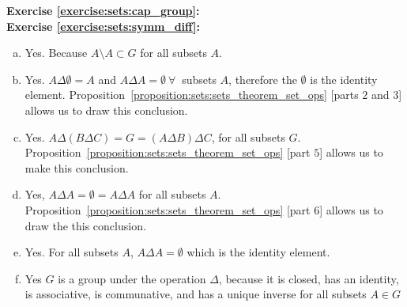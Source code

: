 \noindent\textbf{Exercise \ref{exercise:sets:cap_group}:}\\

\noindent\textbf{Exercise \ref{exercise:sets:symm_diff}:} %
\begin{enumerate}[(a)]
\item
Yes. Because $A\setminus A\subset G$ for all subsets $A$.

\item
Yes. $A\Delta \emptyset=A$ and $A\Delta A=\emptyset\ \forall\ $ subsets $A$, therefore the $\emptyset$ is the identity element. Proposition~\ref{proposition:sets:sets_theorem_set_ops} [parts $2$ and $3$] allows us to draw this conclusion.

\item
Yes. $A\Delta (B \Delta C) = G = (A\Delta B)\Delta C$, for all subsets $G$. Proposition~\ref{proposition:sets:sets_theorem_set_ops} [part $5$] allows us to make this conclusion.

\item
Yes, $A\Delta A=\emptyset=A\Delta A$ for all subsets $A$. Proposition~\ref{proposition:sets:sets_theorem_set_ops} [part $6$] allows us to draw the this conclusion.

\item
Yes. For all subsets $A$, $A\Delta A=\emptyset$ which is the identity element.

\item
Yes $G$ is a group under the operation $\Delta$, because it is closed, has an identity, is associative, is communative, and has a unique inverse for all subsets $A\in G$
\end{enumerate}